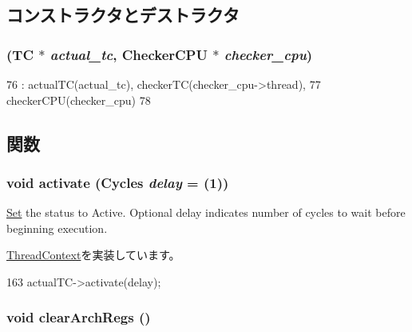 \subsection{コンストラクタとデストラクタ}
\hypertarget{classCheckerThreadContext_ad7e28d441e829abce1f1e5b1a7a3779a}{
\subsubsection[{CheckerThreadContext}]{ (TC $\ast$ {\em actual\_\-tc}, \/  {\bf CheckerCPU} $\ast$ {\em checker\_\-cpu})}}
\label{classCheckerThreadContext_ad7e28d441e829abce1f1e5b1a7a3779a}



\begin{DoxyCode}
76         : actualTC(actual_tc), checkerTC(checker_cpu->thread),
77           checkerCPU(checker_cpu)
78     { }
\end{DoxyCode}


\subsection{関数}
\hypertarget{classCheckerThreadContext_ab542a5cf9ce4b41042d61e42dfe3aeab}{
\subsubsection[{activate}]{\setlength{\rightskip}{0pt plus 5cm}void activate ({\bf Cycles} {\em delay} = {(1)})}}
\label{classCheckerThreadContext_ab542a5cf9ce4b41042d61e42dfe3aeab}
\hyperlink{classSet}{Set} the status to Active. Optional delay indicates number of cycles to wait before beginning execution. 

\hyperlink{classThreadContext_a9270160e6cce25ded6999f6e4e60a3ed}{ThreadContext}を実装しています。


\begin{DoxyCode}
163     { actualTC->activate(delay); }
\end{DoxyCode}
\hypertarget{classCheckerThreadContext_ad5c88ea41846742bd8c70d9c50f31945}{
\subsubsection[{clearArchRegs}]{\setlength{\rightskip}{0pt plus 5cm}void clearArchRegs ()}}
\label{classCheckerThreadContext_ad5c88ea41846742bd8c70d9c50f31945}


